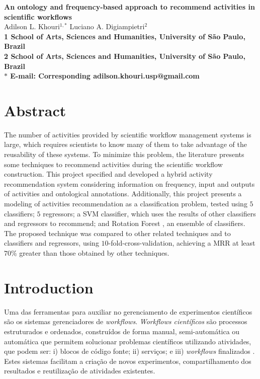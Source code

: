 \documentclass[10pt]{article}
\date{}
\begin{document}
\begin{flushleft}
{\Large
\textbf{An ontology and frequency-based approach to	recommend activities in scientific workflows}
}
\\
Adilson L. Khouri$^{1,\ast}$
Luciano A. Digiampietri$^{2}$
\\
\bf{1} School of Arts, Sciences and Humanities, University of S\~{a}o Paulo, Brazil
\\
\bf{2} School of Arts, Sciences and Humanities, University of S\~{a}o Paulo, Brazil
\\
$\ast$ E-mail: Corresponding adilson.khouri.usp@gmail.com
\end{flushleft}

\section*{Abstract}
The number of activities provided by scientific workflow management systems is large,
which requires scientists to know many of them to take advantage of the reusability
of these systems. To minimize this problem, the literature presents some techniques to recommend activities during the scientific workflow construction. This project specified and developed a hybrid activity recommendation system considering information on frequency, input and outputs of activities and ontological annotations. Additionally, this project presents a modeling of activities recommendation as a classification problem, tested using \(5\) classifiers; \(5\) regressors; a SVM classifier, which uses the results of other classifiers and
regressors to recommend; and Rotation Forest , an ensemble of classifiers. The proposed technique was compared to other related techniques and to classifiers and regressors, using \(10\)-fold-cross-validation, achieving a MRR at least \(70\%\) greater than those obtained by other techniques.


\section*{Introduction}\label{sec:intro}
Uma das ferramentas para auxiliar no gerenciamento de experimentos cient{\'i}ficos s{\~a}o os sistemas gerenciadores de \emph{workflows}. \emph{Workflows cient{\'i}ficos} s{\~a}o processos estruturados e ordenados, constru{\'i}dos de forma manual, semi-autom{\'a}tica ou autom{\'a}tica que permitem solucionar problemas cient{\'i}ficos utilizando atividades, que podem ser: i) blocos de c{\'o}digo fonte; ii) servi\c{c}os; e iii) \emph{workflows} finalizados \cite{Wang2010}. Estes sistemas facilitam a cria\c{c}{\~a}o de novos experimentos, compartilhamento dos resultados e reutiliza\c{c}{\~a}o de atividades existentes.
\end{document}
